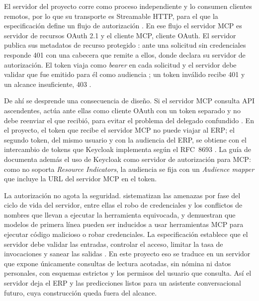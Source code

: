 El servidor del proyecto corre como proceso independiente y lo consumen clientes remotos, por lo que su transporte es Streamable HTTP, para el que la especificación define un flujo de autorización \parencite{MCPSpec2026}. En ese flujo el servidor MCP es servidor de recursos OAuth 2.1 y el cliente MCP, cliente OAuth. El servidor publica sus metadatos de recurso protegido \parencite{RFC9728}: ante una solicitud sin credenciales responde 401 con una cabecera que remite a ellos, donde declara su servidor de autorización. El token viaja como \textit{bearer} en cada solicitud y el servidor debe validar que fue emitido para él como audiencia \parencite{RFC8707}; un token inválido recibe 401 y un alcance insuficiente, 403 \parencite{MCPSpec2026}.

De ahí se desprende una consecuencia de diseño. Si el servidor MCP consulta API ascendentes, actúa ante ellas como cliente OAuth con un token separado y no debe reenviar el que recibió, para evitar el problema del delegado confundido \parencite{MCPSpec2026}. En el proyecto, el token que recibe el servidor MCP no puede viajar al ERP; el segundo token, del mismo usuario y con la audiencia del ERP, se obtiene con el intercambio de tokens que Keycloak implementa según el RFC~8693 \parencite{KeycloakTokenExchange}. La guía de \textcite{Keycloak2026MCP} documenta además el uso de Keycloak como servidor de autorización para MCP: como no soporta \textit{Resource Indicators}, la audiencia se fija con un \textit{Audience mapper} que incluye la URL del servidor MCP en el token.

La autorización no agota la seguridad. \textcite{Hou2025} sistematizan las amenazas por fase del ciclo de vida del servidor, entre ellas el robo de credenciales y los conflictos de nombres que llevan a ejecutar la herramienta equivocada, y \textcite{Radosevich2025} demuestran que modelos de primera línea pueden ser inducidos a usar herramientas MCP para ejecutar código malicioso o robar credenciales. La especificación establece que el servidor debe validar las entradas, controlar el acceso, limitar la tasa de invocaciones y sanear las salidas \parencite{MCPSpec2025}. En este proyecto eso se traduce en un servidor que expone únicamente consultas de lectura acotadas, sin nómina ni datos personales, con esquemas estrictos y los permisos del usuario que consulta. Así el servidor deja el ERP y las predicciones listos para un asistente conversacional futuro, cuya construcción queda fuera del alcance.

